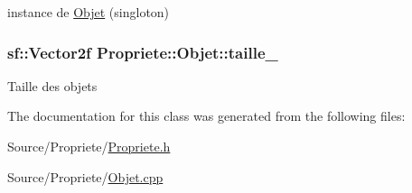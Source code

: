 instance de \hyperlink{classPropriete_1_1Objet}{Objet} (singloton) \hypertarget{classPropriete_1_1Objet_a0f283d62e8e997ef2941646771481f16}{
\subsubsection[{taille\-\_\-}]{\setlength{\rightskip}{0pt plus 5cm}sf\-::\-Vector2f Propriete\-::\-Objet\-::taille\-\_\-\hspace{0.3cm}{\ttfamily [private]}}}\label{classPropriete_1_1Objet_a0f283d62e8e997ef2941646771481f16}
Taille des objets 

The documentation for this class was generated from the following files\-:\begin{DoxyCompactItemize}
\item 
Source/\-Propriete/\hyperlink{Propriete_8h}{Propriete.\-h}\item 
Source/\-Propriete/\hyperlink{Propriete_2Objet_8cpp}{Objet.\-cpp}\end{DoxyCompactItemize}
